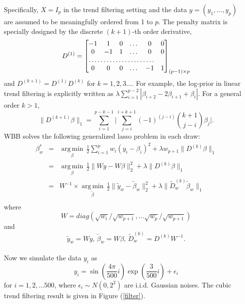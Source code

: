 \documentclass[11pt]{article}%
\DeclareMathOperator*{\argmin}{arg\,min} %
\begin{document}
\noindent Specifically, $X = I_p$ in the trend filtering setting  and the data $y = (y_1, ..., y_p)$ are assumed to be meaningfully ordered from 1 to $p$. The penalty matrix is specially designed by the discrete $(k+1)$-th order  derivative,
$$D^{(1)}=
\begin{bmatrix}
    -1       & 1 & 0 & \dots & 0 & 0 \\
    0       & -1 & 1 & \dots & 0 & 0 \\
    \hdotsfor{5} \\
    0       & 0 & 0 & \dots & -1 & 1
\end{bmatrix}_{(p-1)\times p}
$$
and $D^{(k+1)} = D^{(1)}D^{(k)}$ for $k =1,2,3...$. For example, the log-prior in linear trend filtering is explicitly written as $\lambda\sum_{i=1}^{p-2}|\beta_{i+2} - 2\beta_{i+1} + \beta_{i}|$. For a general order $k >1$, 
$$
\|D^{(k+1)}\beta\|_1 = \sum_{i=1}^{p-k-1} \Big| \sum_{j=i}^{i+k+1} (-1)^{(j-i)} \binom{k+1}{j-i}\beta_j \Big|.
$$
WBB solves the following generalized lasso problem in each draw:
\begin{eqnarray*}
 \beta_w^* &=& \underset{\beta}{\argmin} \, \frac{1}{2}\sum_{i=1}^p w_i(y_i - \beta_i)^2 + \lambda w_{p+1}\|D^{(k)}\beta\|_1\\
&=&\underset{\beta}{\argmin} \, \frac{1}{2}  \|Wy - W\beta\|_2^2  + \lambda \|D^{(k)}\beta\|_1\\
&=&W^{-1} \times \underset{\tilde\beta}{\argmin} \, \frac{1}{2}  \|\tilde{y}_w - \tilde{\beta}_w\|_2^2  + \lambda \|\tilde{D}^{(k)}_w\tilde{\beta}_w\|_1\\
\end{eqnarray*}
where $$W = diag(\sqrt{w_i}/\sqrt{w_{p+1}},... \sqrt{w_p}/\sqrt{w_{p+1}})$$ and $$\tilde{y}_w = Wy, \, \tilde{\beta}_w = W\beta, \,   \tilde{D}^{(k)}_w = D^{(k)}W^{-1}.$$\\

\noindent Now we simulate the data $y_i$ as 
$$
y_i = \sin\left(\frac{4\pi}{500} i\right)\exp\left({\frac{3}{500} i}\right) + \epsilon_i
$$
for $i=1,2,...500$, where $\epsilon_i\sim N(0,2^2)$ are i.i.d. Gaussian noises. The cubic trend filtering result is given in Figure (\ref{filter}). \\
\end{document}
